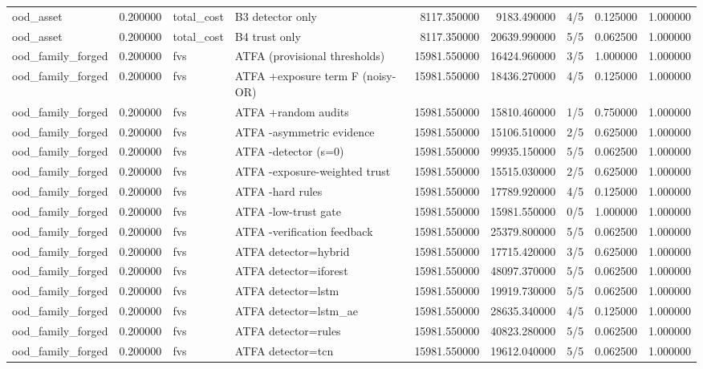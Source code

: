 \begin{tabular}{lrllrrlrr}
ood\_asset & 0.200000 & total\_cost & B3 detector only & 8117.350000 & 9183.490000 & 4/5 & 0.125000 & 1.000000 \\
ood\_asset & 0.200000 & total\_cost & B4 trust only & 8117.350000 & 20639.990000 & 5/5 & 0.062500 & 1.000000 \\
ood\_family\_forged & 0.200000 & fvs & ATFA (provisional thresholds) & 15981.550000 & 16424.960000 & 3/5 & 1.000000 & 1.000000 \\
ood\_family\_forged & 0.200000 & fvs & ATFA +exposure term F (noisy-OR) & 15981.550000 & 18436.270000 & 4/5 & 0.125000 & 1.000000 \\
ood\_family\_forged & 0.200000 & fvs & ATFA +random audits & 15981.550000 & 15810.460000 & 1/5 & 0.750000 & 1.000000 \\
ood\_family\_forged & 0.200000 & fvs & ATFA -asymmetric evidence & 15981.550000 & 15106.510000 & 2/5 & 0.625000 & 1.000000 \\
ood\_family\_forged & 0.200000 & fvs & ATFA -detector (s=0) & 15981.550000 & 99935.150000 & 5/5 & 0.062500 & 1.000000 \\
ood\_family\_forged & 0.200000 & fvs & ATFA -exposure-weighted trust & 15981.550000 & 15515.030000 & 2/5 & 0.625000 & 1.000000 \\
ood\_family\_forged & 0.200000 & fvs & ATFA -hard rules & 15981.550000 & 17789.920000 & 4/5 & 0.125000 & 1.000000 \\
ood\_family\_forged & 0.200000 & fvs & ATFA -low-trust gate & 15981.550000 & 15981.550000 & 0/5 & 1.000000 & 1.000000 \\
ood\_family\_forged & 0.200000 & fvs & ATFA -verification feedback & 15981.550000 & 25379.800000 & 5/5 & 0.062500 & 1.000000 \\
ood\_family\_forged & 0.200000 & fvs & ATFA detector=hybrid & 15981.550000 & 17715.420000 & 3/5 & 0.625000 & 1.000000 \\
ood\_family\_forged & 0.200000 & fvs & ATFA detector=iforest & 15981.550000 & 48097.370000 & 5/5 & 0.062500 & 1.000000 \\
ood\_family\_forged & 0.200000 & fvs & ATFA detector=lstm & 15981.550000 & 19919.730000 & 5/5 & 0.062500 & 1.000000 \\
ood\_family\_forged & 0.200000 & fvs & ATFA detector=lstm\_ae & 15981.550000 & 28635.340000 & 4/5 & 0.125000 & 1.000000 \\
ood\_family\_forged & 0.200000 & fvs & ATFA detector=rules & 15981.550000 & 40823.280000 & 5/5 & 0.062500 & 1.000000 \\
ood\_family\_forged & 0.200000 & fvs & ATFA detector=tcn & 15981.550000 & 19612.040000 & 5/5 & 0.062500 & 1.000000 \\

\end{tabular}
